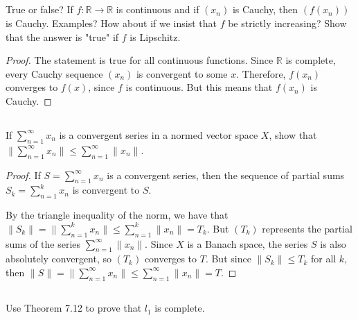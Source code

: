 
\subsection{} True or false? If $f: \mathbb{R} \rightarrow \mathbb{R}$ is continuous and if $(x_n)$ is Cauchy, then $(f(x_n))$ is Cauchy. Examples? How about if we insist that $f$ be strictly increasing? Show that the answer is "true" if $f$ is Lipschitz. 

\begin{proof}
The statement is true for all continuous functions. Since $\mathbb{R}$ is complete, every Cauchy sequence $(x_n)$ is convergent to some $x$. Therefore, $f(x_n)$ converges to $f(x)$, since $f$ is continuous. But this means that $f(x_n)$ is Cauchy.

\end{proof}


\subsection{} If $\sum_{n=1}^\infty x_n$ is a convergent series in  a normed vector space $X$, show that $\|\sum_{n=1}^\infty x_n\| \leq \sum_{n=1}^\infty \|x_n\|$.

\begin{proof}
If $S = \sum_{n=1}^\infty x_n$ is a convergent series, then the sequence of partial sums $S_k = \sum_{n=1}^k x_n$ is convergent to $S$.

By the triangle inequality of the norm, we have that $\|S_k\| = \|\sum_{n=1}^k x_n\| \leq \sum_{n=1}^k \|x_n\| = T_k$. But $(T_k)$ represents the partial sums of the series $\sum_{n=1}^\infty \|x_n\|$. Since $X$ is a Banach space, the series $S$ is also absolutely convergent, so $(T_k)$ converges to $T$. But since $\|S_k\| \leq T_k$ for all $k$, then $\|S\| = \|\sum_{n=1}^\infty x_n\| \leq \sum_{n=1}^\infty \|x_n\| = T$.

\end{proof}

\subsection{} Use Theorem 7.12 to prove that $l_1$ is complete.

